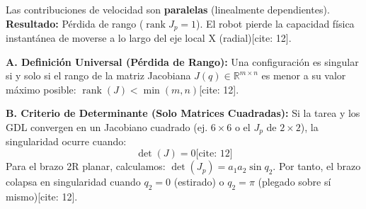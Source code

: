 \documentclass[11pt, a4paper, landscape]{article}
\begin{document}
\begin{minipage}{0.48\textwidth}
    \begin{tcolorbox}[colback=white, colframe=red!70!black, title=\textbf{2. Configuración Singular ($q_2 = 0$)[cite: 12]}]
        \centering
        \vspace{0.4cm}
        \vspace{0.4cm}
        
        Las contribuciones de velocidad son \textbf{paralelas} (linealmente dependientes). \\
        \textbf{Resultado:} Pérdida de rango ($\operatorname{rank} J_p = 1$). El robot pierde la capacidad física instantánea de moverse a lo largo del eje local X (radial)[cite: 12].
    \end{tcolorbox}
\end{minipage}

\vspace{0.5cm}

\begin{tcolorbox}[colback=gray!5, colframe=black, title=\textbf{3. Criterios Analíticos de Singularidad[cite: 12]}]
    \textbf{A. Definición Universal (Pérdida de Rango):}
    Una configuración es singular si y solo si el rango de la matriz Jacobiana $J(q) \in \mathbb{R}^{m \times n}$ es menor a su valor máximo posible: $\operatorname{rank}(J) < \min(m, n)$[cite: 12].
    
    \vspace{0.2cm}
    \textbf{B. Criterio de Determinante (Solo Matrices Cuadradas):}
    Si la tarea y los GDL convergen en un Jacobiano cuadrado (ej. $6 \times 6$ o el $J_p$ de $2 \times 2$), la singularidad ocurre cuando:
    \begin{equation*}
        \det(J) = 0 \text{[cite: 12]}
    \end{equation*}
    Para el brazo 2R planar, calculamos: $\det(J_p) = a_1 a_2 \sin q_2$. Por tanto, el brazo colapsa en singularidad cuando $q_2 = 0$ (estirado) o $q_2 = \pi$ (plegado sobre sí mismo)[cite: 12].
\end{tcolorbox}
\end{document}
